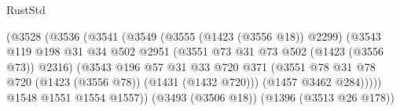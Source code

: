 \begin{lexlean}{RustStd}
\begin{coremodule}
                                                (@3528
                                                  (@3536
                                                    (@3541
                                                      (@3549
                                                        (@3555 (@1423 (@3556 @18)) @2299)
                                                        (@3543
                                                          @119
                                                          @198
                                                          @31
                                                          @34
                                                          @502
                                                          @2951
                                                          (@3551
                                                            @73
                                                            @31
                                                            @73
                                                            @502
                                                            (@1423 (@3556 @73))
                                                            @2316)
                                                          (@3543
                                                            @196
                                                            @57
                                                            @31
                                                            @33
                                                            @720
                                                            @371
                                                            (@3551
                                                              @78
                                                              @31
                                                              @78
                                                              @720
                                                              (@1423 (@3556 @78))
                                                              (@1431 (@1432 @720)))
                                                            (@1457 @3462 @284)))))
                                                    @1548
                                                    @1551
                                                    @1554
                                                    @1557))
                                                (@3493 (@3506 @18))
                                                (@1396 (@3513 @26 @178))

\end{coremodule}
\end{lexlean}
